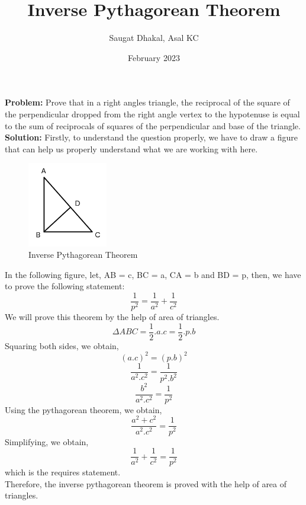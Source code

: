\documentclass[a4paper,17pt]{extarticle}
\title{Inverse Pythagorean Theorem}
\author{Saugat Dhakal, Asal KC }
\date{February 2023}
\begin{document}
\maketitle

\section{}
\textbf{Problem:} Prove that in a right angles triangle, the reciprocal of the square of the perpendicular dropped from the right angle vertex to the hypotenuse is equal to the sum of reciprocals of squares of the perpendicular and base of the triangle. \\ 
\textbf{Solution:} Firstly, to understand the question properly, we have to draw a figure that can help us properly understand what we are working with here. \\
\begin{figure}[H]
    \centering
    \includegraphics[width=3.5cm]{static/Screenshot from 2023-02-05 18-34-23.png}
    \caption{Inverse Pythagorean Theorem}
    \label{fig:galaxy}
\end{figure}
In the following figure, let, AB = c, BC = a, CA = b and BD = p, then, we have to prove the following statement:
\[\frac{1}{p^2} = \frac{1}{a^2} + \frac{1}{c^2}\]
We will prove this theorem by the help of area of triangles.
\[\Delta ABC = \frac{1}{2}.a.c = \frac{1}{2}.p.b\]
Squaring both sides, we obtain, 
\[(a.c)^2 = (p.b)^2\]
\[\frac{1}{a^2.c^2} = \frac{1}{p^2.b^2}\]
\[\frac{b^2}{a^2.c^2} = \frac{1}{p^2}\]
Using the pythagorean theorem, we obtain,
\[\frac{a^2 + c^2}{a^2.c^2} = \frac{1}{p^2}\]
Simplifying, we obtain, 
\[\frac{1}{a^2} + \frac{1}{c^2} = \frac{1}{p^2}\]
which is the requires statement. \\
Therefore, the inverse pythagorean theorem is proved with the help of area of triangles.
\end{document}
